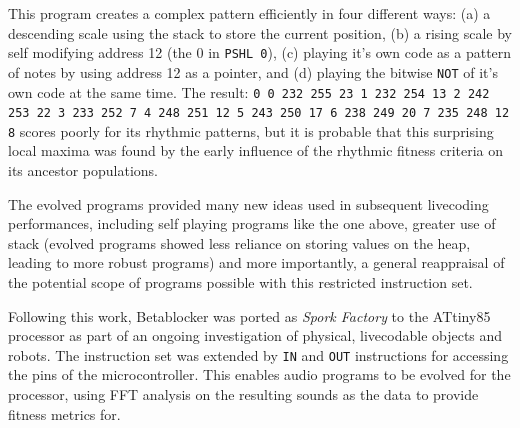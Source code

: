 \documentclass[letterpaper, 12pt]{article}
\begin{document}
This program creates a complex pattern efficiently in four different ways:
 (a) a descending scale using the stack to store the current position,
 (b) a rising scale by self modifying address 12 (the 0 in \texttt{PSHL 0}),
 (c) playing it's own code as a pattern of notes by using address 12 as a pointer, and
 (d) playing the bitwise \texttt{NOT} of it's own code at the same time.
% 
% 
The result: \texttt{0 0 232 255 23 1 232 254 13 2 242 253 22 3 233 252 7 4 248 251 12 5 243 250 17 6 238 249 20 7 235 248 12 8} scores poorly for its rhythmic patterns, but it is probable that this surprising local maxima was found by the early influence of the rhythmic fitness criteria on its ancestor populations. 

The evolved programs provided many new ideas used in subsequent livecoding performances,  including self playing programs like the one above, greater use of stack (evolved programs showed less reliance on storing values on the heap, leading to more robust programs) and more importantly, a general reappraisal of the potential scope of programs possible with this restricted instruction set.

Following this work, Betablocker was ported as \emph{Spork Factory} to the ATtiny85 processor as part of an ongoing investigation of physical, livecodable objects and robots. 
The instruction set was extended by \texttt{IN} and \texttt{OUT} instructions for accessing the pins of the microcontroller. 
This enables audio programs to be evolved for the processor, using FFT analysis on the resulting sounds as the data to provide fitness metrics for.

\end{document}
